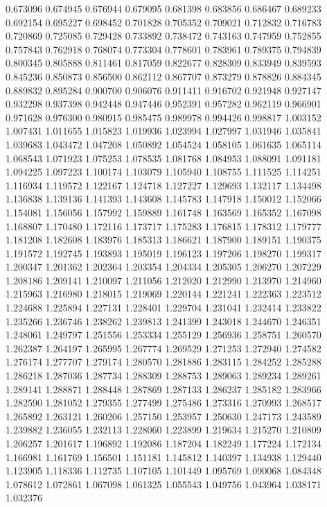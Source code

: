 0.673096
0.674945
0.676944
0.679095
0.681398
0.683856
0.686467
0.689233
0.692154
0.695227
0.698452
0.701828
0.705352
0.709021
0.712832
0.716783
0.720869
0.725085
0.729428
0.733892
0.738472
0.743163
0.747959
0.752855
0.757843
0.762918
0.768074
0.773304
0.778601
0.783961
0.789375
0.794839
0.800345
0.805888
0.811461
0.817059
0.822677
0.828309
0.833949
0.839593
0.845236
0.850873
0.856500
0.862112
0.867707
0.873279
0.878826
0.884345
0.889832
0.895284
0.900700
0.906076
0.911411
0.916702
0.921948
0.927147
0.932298
0.937398
0.942448
0.947446
0.952391
0.957282
0.962119
0.966901
0.971628
0.976300
0.980915
0.985475
0.989978
0.994426
0.998817
1.003152
1.007431
1.011655
1.015823
1.019936
1.023994
1.027997
1.031946
1.035841
1.039683
1.043472
1.047208
1.050892
1.054524
1.058105
1.061635
1.065114
1.068543
1.071923
1.075253
1.078535
1.081768
1.084953
1.088091
1.091181
1.094225
1.097223
1.100174
1.103079
1.105940
1.108755
1.111525
1.114251
1.116934
1.119572
1.122167
1.124718
1.127227
1.129693
1.132117
1.134498
1.136838
1.139136
1.141393
1.143608
1.145783
1.147918
1.150012
1.152066
1.154081
1.156056
1.157992
1.159889
1.161748
1.163569
1.165352
1.167098
1.168807
1.170480
1.172116
1.173717
1.175283
1.176815
1.178312
1.179777
1.181208
1.182608
1.183976
1.185313
1.186621
1.187900
1.189151
1.190375
1.191572
1.192745
1.193893
1.195019
1.196123
1.197206
1.198270
1.199317
1.200347
1.201362
1.202364
1.203354
1.204334
1.205305
1.206270
1.207229
1.208186
1.209141
1.210097
1.211056
1.212020
1.212990
1.213970
1.214960
1.215963
1.216980
1.218015
1.219069
1.220144
1.221241
1.222363
1.223512
1.224688
1.225894
1.227131
1.228401
1.229704
1.231041
1.232414
1.233822
1.235266
1.236746
1.238262
1.239813
1.241399
1.243018
1.244670
1.246351
1.248061
1.249797
1.251556
1.253334
1.255129
1.256936
1.258751
1.260570
1.262387
1.264197
1.265995
1.267774
1.269529
1.271253
1.272940
1.274582
1.276174
1.277707
1.279174
1.280570
1.281886
1.283115
1.284252
1.285288
1.286218
1.287036
1.287734
1.288309
1.288753
1.289063
1.289234
1.289261
1.289141
1.288871
1.288448
1.287869
1.287133
1.286237
1.285182
1.283966
1.282590
1.281052
1.279355
1.277499
1.275486
1.273316
1.270993
1.268517
1.265892
1.263121
1.260206
1.257150
1.253957
1.250630
1.247173
1.243589
1.239882
1.236055
1.232113
1.228060
1.223899
1.219634
1.215270
1.210809
1.206257
1.201617
1.196892
1.192086
1.187204
1.182249
1.177224
1.172134
1.166981
1.161769
1.156501
1.151181
1.145812
1.140397
1.134938
1.129440
1.123905
1.118336
1.112735
1.107105
1.101449
1.095769
1.090068
1.084348
1.078612
1.072861
1.067098
1.061325
1.055543
1.049756
1.043964
1.038171
1.032376
